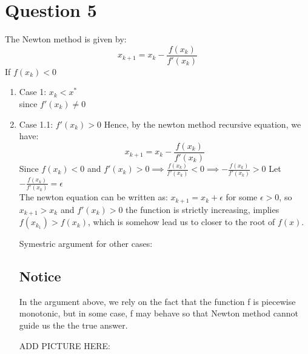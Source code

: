 \documentclass[11pt]{article}
\newcommand{\1}{\mathbbm{1}}
\begin{document}
\section{Question 5}
The Newton method is given by:
$$x_{k+1} = x_k -\frac{f(x_k)}{f'(x_k)}$$
If $f(x_k) < 0$\\
\begin{enumerate}

\item Case 1: $ x_k < x^* $\\
since $f'(x_k) \neq 0 $
\item Case 1.1: $f'(x_k) > 0 $
Hence, by the newton method recursive equation, we have:
$$x_{k+1} = x_k -\frac{f(x_k)}{f'(x_k)}$$
Since $f(x_k) <0$ and $f'(x_k) > 0 \implies \frac{f(x_k)}{f'(x_k)} < 0 \implies -\frac{f(x_k)}{f'(x_k)}>0$
Let $-\frac{f(x_k)}{f'(x_k)} = \epsilon$\\
The newton equation can be written as:
$x_{k+1} = x_k + \epsilon$ for some $\epsilon >0$, so $x_{k+1}>x_k$ and $f'(x_k) > 0$ the function is strictly increasing, implies $f(x_{k_1}) > f(x_k)$, which is somehow lead us to closer to the root of $f(x)$.

Symestric argument for other cases:

\subsection{Notice}
In the argument above, we rely on the fact that the function f is piecewise monotonic, but in some case, f may behave so that Newton method cannot guide us the the true answer.

ADD PICTURE HERE:




\end{enumerate}
\end{document}
